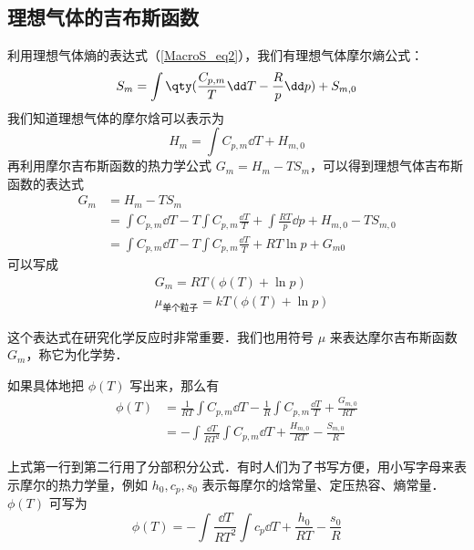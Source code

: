 \subsection{理想气体的吉布斯函数}
利用理想气体熵的表达式（\autoref{MacroS_eq2}），我们有理想气体摩尔熵公式：
\begin{equation}
S_m=\int \qty(\frac{C_{p,m}}{T}\dd T-\frac{R}{p}\dd p)+S_{m,0}
\end{equation}
我们知道理想气体的摩尔焓可以表示为
\begin{equation}
H_m=\int C_{p,m}\dd T+H_{m,0}
\end{equation}
再利用摩尔吉布斯函数的热力学公式 $G_m=H_m-TS_m$，可以得到理想气体吉布斯函数的表达式
\begin{equation}
\begin{aligned}
G_m&=H_m-TS_m\\
&=\int C_{p,m} \dd T - T\int C_{p,m} \frac{\dd T}{T}+\int \frac{RT}{p}\dd p +H_{m,0}-TS_{m,0}
\\
&=\int C_{p,m} \dd T - T\int C_{p,m} \frac{\dd T}{T}+RT\ln p+G_{m0}
\end{aligned}
\end{equation}
可以写成
\begin{equation}\label{GibbsG_eq3}
\begin{aligned}
&G_m=RT(\phi(T)+\ln p)\\
&\mu_{\text{单个粒子}} = kT(\phi(T)+\ln p)
\end{aligned}
\end{equation}

这个表达式在研究化学反应时非常重要．我们也用符号 $\mu$ 来表达摩尔吉布斯函数 $G_m$，称它为化学势．

如果具体地把 $\phi(T)$ 写出来，那么有
\begin{equation}\label{GibbsG_eq4}
\begin{aligned}
\phi(T)&=\frac{1}{RT}\int C_{p,m}\dd T-\frac{1}{R}\int C_{p,m}\frac{\dd T}{T}+\frac{G_{m,0}}{RT}\\
&=-\int \frac{\dd T}{RT^2}\int C_{p,m}\dd T+\frac{H_{m,0}}{RT}-\frac{S_{m,0}}{R}
\end{aligned}
\end{equation}

上式第一行到第二行用了分部积分公式．有时人们为了书写方便，用小写字母来表示摩尔的热力学量，例如 $h_0,c_p,s_0$ 表示每摩尔的焓常量、定压热容、熵常量．$\phi(T)$ 可写为
\begin{equation}
\phi(T)=-\int\frac{\dd T}{RT^2}\int c_{p}\dd T+\frac{h_{0}}{RT}-\frac{s_{0}}{R}
\end{equation}

